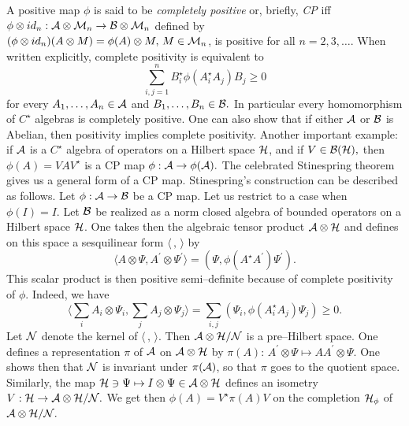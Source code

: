\documentclass[12pt]{article}
\def\be{\begin{equation}} \def\ee{\end{equation}}
\begin{document}
A positive map $
\phi$ is said to be {\em completely positive} or,  briefly,   {\em CP}
 iff $\phi \otimes id_n
: {\cal A }\otimes {\cal M}_n \rightarrow {\cal B}\otimes {\cal M}_n $ defined
by $  (\phi\otimes id_n)  (A\otimes M ) = \phi  (A)\otimes M , \,  M\in {\cal M}_n
$, is positive for all $n=2, 3, \ldots . $ When written explicitly,  complete
positivity is equivalent to \be \sum_{i, j=1}^n B_i^{\star}\phi
 (A_i^{\star}A_j)B_j \geq 0 \ee for every $A_1, \ldots , A_n \in {\cal A}$ and
$B_1, \ldots , B_n \in {\cal B} . $ In particular every homomorphism of 
$C^{\star}$ algebras is completely positive.  One can also show that if either 
${\cal A}$ or ${\cal B}$ is Abelian,  then positivity implies complete
positivity.  Another important example:  if ${\cal A}$ is a $C^{\star }$ 
algebra of
operators on a Hilbert space ${\cal H}$,  and if $V\in {\cal B} ({\cal H}) , $
then $\phi  (A) = VAV^{\star}$ is a CP map $\phi :  {\cal A}
\rightarrow \phi ({\cal A}) . $ The celebrated Stinespring theorem gives us a
general form of a CP map.  Stinespring's construction can be
described as follows.  Let $\phi :  {\cal A}\rightarrow {\cal B}$ be a
CP map.  Let us restrict to a case when $\phi  (I)=I . $ 
Let ${\cal B}$ be
realized as a norm closed algebra of bounded operators on a Hilbert space 
${\cal H}$.  One takes then the algebraic tensor product ${\cal A}\otimes 
{\cal H}$ and defines on this space a sesquilinear form $ \langle\,  , \,  \rangle$ by 
\be \langle A\otimes \Psi ,  A^{\prime}\otimes
\Psi^{\prime}\rangle= (\Psi ,  \phi  (A^{\star}A^{\prime} ) \Psi^{\prime}) .  \ee
This scalar product is then positive semi--definite because of complete
positivity of $\phi . $ Indeed,  we have \be \langle \sum_i A_i\otimes\Psi_i ,  \sum_j
A_j\otimes\Psi_j \rangle = \sum_{i, j}  (\Psi_i, \phi  (A_i^{\star } A_j ) \Psi_j )
\geq 0 .  \ee  Let ${\cal N}$ denote the kernel of $ \langle\,  , \,  \rangle$.  
Then ${\cal A}\otimes {\cal H} / {\cal N} $ is a
pre--Hilbert space.  One defines a representation $\pi$ of ${\cal A}$ on 
${\cal A}\otimes {\cal H}$ by $\pi  (A) : \,  A^{\prime}\otimes\Psi\longmapsto
AA^{\prime}\otimes\Psi . $ One shows then that ${\cal N}$ is invariant under $
\pi  ({\cal A})$,  so that $\pi $ goes to the quotient space.  Similarly,  the
map ${\cal H}\ni\Psi \mapsto I\otimes \Psi \in {\cal A}\otimes{\cal H}$ 
defines an isometry $V :  {\cal H}
\rightarrow {\cal A}\otimes {\cal H} / {\cal N} . $ We get then $
\phi  (A) = V^{\star}\pi  (A) V $ on the completion ${\cal H}_{\phi } $ of $
{\cal A}\otimes {\cal H} / {\cal N} . $ \vspace{0.5cm}
\end{document}
